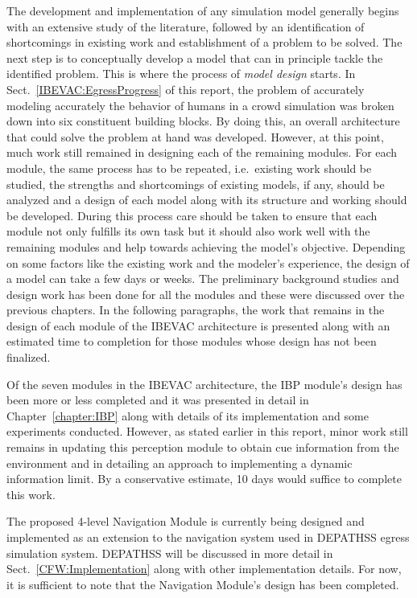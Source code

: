 The development and implementation of any simulation model generally begins with an extensive study of the literature, followed by an identification of shortcomings in existing work and establishment of a problem to be solved. The next step is to conceptually develop a model that can in principle tackle the identified problem. This is where the process of \emph{model design} starts. In Sect.~\ref{IBEVAC:EgressProgress} of this report, the problem of accurately modeling accurately the behavior of humans in a crowd simulation was broken down into six constituent building blocks. By doing this, an overall architecture that could solve the problem at hand was developed. However, at this point, much work still remained in designing each of the remaining modules. For each module, the same process has to be repeated, i.e.\ existing work should be studied, the strengths and shortcomings of existing models, if any, should be analyzed and a design of each model along with its structure and working should be developed. During this process care should be taken to ensure that each module not only fulfills its own task but it should also work well with the remaining modules and help towards achieving the model's objective. Depending on some factors like the existing work and the modeler's experience, the design of a model can take a few days or weeks. The preliminary background studies and design work has been done for all the modules and these were discussed over the previous chapters. In the following paragraphs, the work that remains in the design of each module of the IBEVAC architecture is presented along with an estimated time to completion for those modules whose design has not been finalized.

Of the seven modules in the IBEVAC architecture, the IBP module's design has been more or less completed and it was presented in detail in Chapter~\ref{chapter:IBP} along with details of its implementation and some experiments conducted. However, as stated earlier in this report, minor work still remains in updating this perception module to obtain cue information from the environment and in detailing an approach to implementing a dynamic information limit. By a conservative estimate, 10 days would suffice to complete this work.

The proposed 4-level Navigation Module is currently being designed and implemented as an extension to the navigation system used in DEPATHSS egress simulation system. DEPATHSS will be discussed in more detail in Sect.~\ref{CFW:Implementation} along with other implementation details. For now, it is sufficient to note that the Navigation Module's design has been completed.

